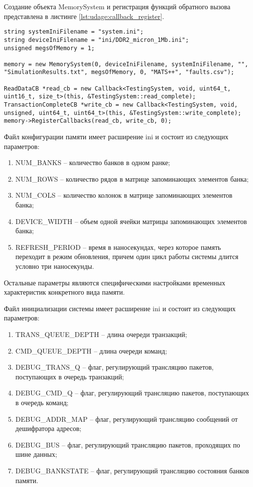 Создание объекта MemorySystem и регистрация функций обратного вызова представлена в листинге \ref{lst:udage:callback_register}.

\begin{lstlisting}[style=cplusplusstyle, caption={Инициализация системы и регистрация функций обратного вызова}, label=lst:udage:callback_register]
string systemIniFilename = "system.ini";
string deviceIniFilename = "ini/DDR2_micron_1Mb.ini";
unsigned megsOfMemory = 1;

memory = new MemorySystem(0, deviceIniFilename, systemIniFilename, "", "SimulationResults.txt", megsOfMemory, 0, "MATS++", "faults.csv");

ReadDataCB *read_cb = new Callback<TestingSystem, void, uint64_t, uint16_t, size_t>(this, &TestingSystem::read_complete);
TransactionCompleteCB *write_cb = new Callback<TestingSystem, void, unsigned, uint64_t, uint64_t>(this, &TestingSystem::write_complete);
memory->RegisterCallbacks(read_cb, write_cb, 0);
\end{lstlisting}

Файл конфигурации памяти имеет расширение ini и состоит из следующих параметров:
\begin{enumerate}
\item NUM\_BANKS -- количество банков в одном ранке;
\item NUM\_ROWS -- количество рядов в матрице запоминающих элементов банка;
\item NUM\_COLS -- количество колонок в матрице запоминающих элементов банка;
\item DEVICE\_WIDTH -- объем одной ячейки матрицы запоминающих элементов банка;
\item REFRESH\_PERIOD -- время в наносекундах, через которое память переходит в режим обновления, причем один цикл работы системы длится условно три наносекунды.
\end{enumerate}

Остальные параметры являются специфическими настройками временных характеристик конкретного вида памяти.

Файл инициализации системы имеет расширение ini и состоит из следующих параметров:
\begin{enumerate}
\item TRANS\_QUEUE\_DEPTH -- длина очереди транзакций;
\item CMD\_QUEUE\_DEPTH -- длина очереди команд;
\item DEBUG\_TRANS\_Q -- флаг, регулирующий трансляцию пакетов, поступающих в очередь транзакций;  
\item DEBUG\_CMD\_Q -- флаг, регулирующий трансляцию пакетов, поступающих в очередь команд;  
\item DEBUG\_ADDR\_MAP -- флаг, регулирующий трансляцию сообщений от дешифратора адресов; 
\item DEBUG\_BUS -- флаг, регулирующий трансляцию пакетов, проходящих по шине данных; 
\item DEBUG\_BANKSTATE -- флаг, регулирующий трансляцию состояния банков памяти.
\end{enumerate}

